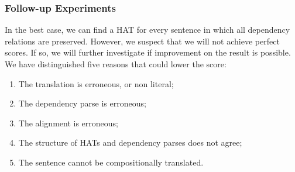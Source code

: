\documentclass{report}
\theoremstyle{definition}
\theoremstyle{plain}
\begin{document}
\subsubsection{Follow-up Experiments}


In the best case, we can find a HAT for every sentence in which all dependency relations are preserved. However, we suspect that we will not achieve perfect scores. If so, we will further investigate if improvement on the result is possible. We have distinguished five reasons that could lower the score:

\begin{enumerate}
\item The translation is erroneous, or non literal;
\item The dependency parse is erroneous;
\item The alignment is erroneous;
\item The structure of HATs and dependency parses does not agree;
\item The sentence cannot be compositionally translated.
\end{enumerate}
\end{document}

